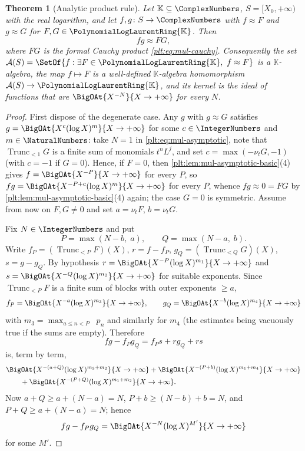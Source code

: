 \documentclass[11pt,oneside]{article}
\theoremstyle{plain}
\newtheorem{theorem}{Theorem}[section]
\theoremstyle{definition}
\theoremstyle{remark}
\newcommand{\K}{\mathbb{K}}
\newcommand{\PLlau}{\PolynomialLogLaurentRing{\K}}       %
\newcommand{\ordt}{\nu_{t}}                              %
\DeclareMathOperator{\degL}{deg_{L}}
\newcommand{\Trunc}[2]{\operatorname{Trunc}_{<#2}#1}     %
\begin{document}
\begin{theorem}[Analytic product rule]
\label{plt:thm:mul-analytic-product}
Let $\K\subseteq\ComplexNumbers$, $S=[X_0,+\infty)$ with the real logarithm,
and let $f,g\colon S\to\ComplexNumbers$ with $f\approx F$ and $g\approx G$
for $F,G\in\PLlau$.  Then
\[
 fg\approx FG,
\]
where $FG$ is the formal Cauchy product \eqref{plt:eq:mul-cauchy}.
Consequently the set
$\mathcal A(S)=\SetOf{f:\exists F\in\PLlau,\ f\approx F}$ is a
$\K$-algebra, the map $f\mapsto F$ is a well-defined $\K$-algebra
homomorphism $\mathcal A(S)\to\PLlau$, and its kernel is the ideal of
functions that are $\BigOAt{X^{-N}}{X\to+\infty}$ for every $N$.
\end{theorem}

\begin{proof}
First dispose of the degenerate case.  Any $g$ with $g\approx G$ satisfies
$g=\BigOAt{X^{c}(\log X)^{m}}{X\to+\infty}$ for some $c\in\IntegerNumbers$
and $m\in\NaturalNumbers$: take $N=1$ in \eqref{plt:eq:mul-asymptotic}, note
that $\Trunc{G}{1}$ is a finite sum of monomials $t^nL^j$, and set
$c=\max(-\ordt G,-1)$ (with $c=-1$ if $G=0$).  Hence, if $F=0$, then
\cref{plt:lem:mul-asymptotic-basic}(4) gives
$f=\BigOAt{X^{-P}}{X\to+\infty}$ for every $P$, so
$fg=\BigOAt{X^{-P+c}(\log X)^{m}}{X\to+\infty}$ for every $P$, whence
$fg\approx0=FG$ by \cref{plt:lem:mul-asymptotic-basic}(4) again; the case
$G=0$ is symmetric.  Assume from now on $F,G\ne0$ and set $a=\ordt F$,
$b=\ordt G$.

Fix $N\in\IntegerNumbers$ and put
\[
 P=\max(N-b,\;a),
 \qquad
 Q=\max(N-a,\;b).
\]
Write $f_P=(\Trunc{F}{P})(X)$, $r=f-f_P$, $g_Q=(\Trunc{G}{Q})(X)$,
$s=g-g_Q$.  By hypothesis
$r=\BigOAt{X^{-P}(\log X)^{m_1}}{X\to+\infty}$ and
$s=\BigOAt{X^{-Q}(\log X)^{m_2}}{X\to+\infty}$ for suitable exponents.  Since
$\Trunc{F}{P}$ is a finite sum of blocks with outer exponents $\ge a$,
\[
 f_P=\BigOAt{X^{-a}(\log X)^{m_3}}{X\to+\infty},
 \qquad
 g_Q=\BigOAt{X^{-b}(\log X)^{m_4}}{X\to+\infty}
\]
with $m_3=\max_{a\le n<P}\degL p_n$ and similarly for $m_4$ (the estimates
being vacuously true if the sums are empty).  Therefore
\[
 fg-f_Pg_Q=f_Ps+rg_Q+rs
\]
is, term by term,
\begin{align*}
 &\BigOAt{X^{-(a+Q)}(\log X)^{m_3+m_2}}{X\to+\infty}
 +\BigOAt{X^{-(P+b)}(\log X)^{m_1+m_4}}{X\to+\infty}\\
 &\qquad
 +\BigOAt{X^{-(P+Q)}(\log X)^{m_1+m_2}}{X\to+\infty}.
\end{align*}
Now $a+Q\ge a+(N-a)=N$, $P+b\ge(N-b)+b=N$, and $P+Q\ge a+(N-a)=N$; hence
\begin{equation}\label{plt:eq:mul-analytic-step1}
 fg-f_Pg_Q=\BigOAt{X^{-N}(\log X)^{M'}}{X\to+\infty}
\end{equation}
for some $M'$.


\end{proof}
\end{document}
